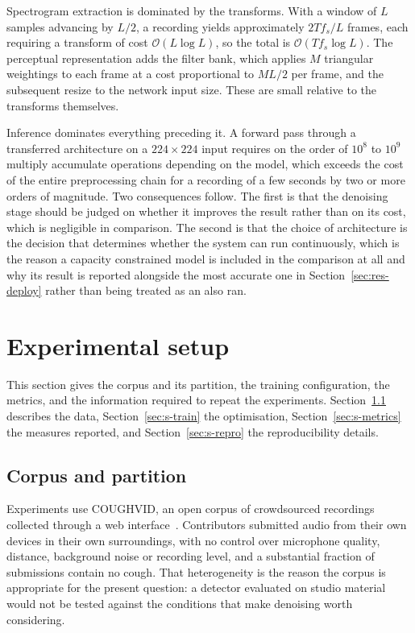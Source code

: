 \documentclass[pdflatex,sn-mathphys-num]{sn-jnl}
\begin{document}
Spectrogram extraction is dominated by the transforms. With a window of
$L$ samples advancing by $L/2$, a recording yields approximately
$2 T f_s / L$ frames, each requiring a transform of cost
$\mathcal{O}(L \log L)$, so the total is $\mathcal{O}(T f_s \log L)$. The
perceptual representation adds the filter bank, which applies $M$ triangular
weightings to each frame at a cost proportional to $M L / 2$ per frame, and
the subsequent resize to the network input size. These are small relative to
the transforms themselves.

Inference dominates everything preceding it. A forward pass through a
transferred architecture on a $224 \times 224$ input requires on the order of
$10^8$ to $10^9$ multiply accumulate operations depending on the model, which
exceeds the cost of the entire preprocessing chain for a recording of a few
seconds by two or more orders of magnitude. Two consequences follow. The
first is that the denoising stage should be judged on whether it improves the
result rather than on its cost, which is negligible in comparison. The second
is that the choice of architecture is the decision that determines whether the
system can run continuously, which is the reason a capacity constrained model
is included in the comparison at all and why its result is reported alongside
the most accurate one in Section~\ref{sec:res-deploy} rather than being
treated as an also ran.

\section{Experimental setup}\label{sec:setup}

This section gives the corpus and its partition, the training configuration,
the metrics, and the information required to repeat the experiments.
Section~\ref{sec:s-data} describes the data, Section~\ref{sec:s-train} the
optimisation, Section~\ref{sec:s-metrics} the measures reported, and
Section~\ref{sec:s-repro} the reproducibility details.

\subsection{Corpus and partition}\label{sec:s-data}

Experiments use COUGHVID, an open corpus of crowdsourced recordings collected
through a web interface~\cite{orlandic2021}. Contributors submitted audio from
their own devices in their own surroundings, with no control over microphone
quality, distance, background noise or recording level, and a substantial
fraction of submissions contain no cough. That heterogeneity is the reason the
corpus is appropriate for the present question: a detector evaluated on
studio material would not be tested against the conditions that make
denoising worth considering.
\end{document}
